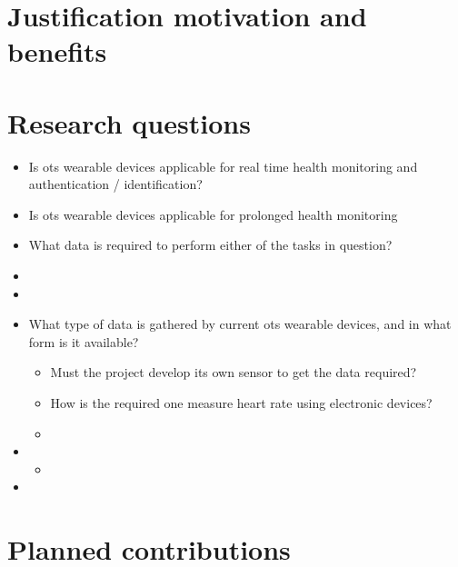\section{Justification motivation and benefits}\label{sec:}


\section{Research questions}\label{sec:}

\begin{itemize}
\item Is \gls{ots} wearable devices applicable for real time health
	monitoring and authentication / identification?

\item Is \gls{ots} wearable devices applicable for prolonged health
	monitoring

\item What data is required to perform either of the tasks in question?

\item 

\item 

\item What type of data is gathered by current \gls{ots} wearable devices,
	and in what form is it available?

\begin{itemize}
	\item Must the project develop its own sensor to get the data required?
	\item How is the required one measure heart rate using electronic devices?
	\item 
\end{itemize}

\item 

\begin{itemize}
\item 
\end{itemize}

\item 

\end{itemize}


\section{Planned contributions}\label{sec:}


